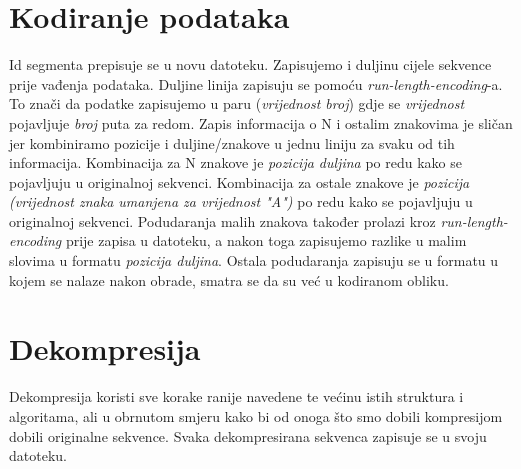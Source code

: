 \section{Kodiranje podataka}
Id segmenta prepisuje se u novu datoteku. Zapisujemo i duljinu cijele sekvence prije vađenja podataka. Duljine linija zapisuju se pomoću \textit{run-length-encoding}-a. To znači da podatke zapisujemo u paru (\textit{vrijednost  broj}) gdje se \textit{vrijednost} pojavljuje \textit{broj} puta za redom. Zapis informacija o N i ostalim znakovima je sličan jer kombiniramo pozicije i duljine/znakove u jednu liniju za svaku od tih informacija. Kombinacija za N znakove je \textit{pozicija duljina} po redu kako se pojavljuju u originalnoj sekvenci. Kombinacija za ostale znakove je \textit{pozicija (vrijednost znaka umanjena za vrijednost "A")} po redu kako se pojavljuju u originalnoj sekvenci. Podudaranja malih znakova također prolazi kroz \textit{run-length-encoding} prije zapisa u datoteku, a nakon toga zapisujemo razlike u malim slovima u formatu \textit{pozicija duljina}. Ostala podudaranja zapisuju se u formatu u kojem se nalaze nakon obrade, smatra se da su već u kodiranom obliku.

\section{Dekompresija}
Dekompresija koristi sve korake ranije navedene te većinu istih struktura i algoritama, ali u obrnutom smjeru kako bi od onoga što smo dobili kompresijom dobili originalne sekvence. Svaka dekompresirana sekvenca zapisuje se u svoju datoteku.